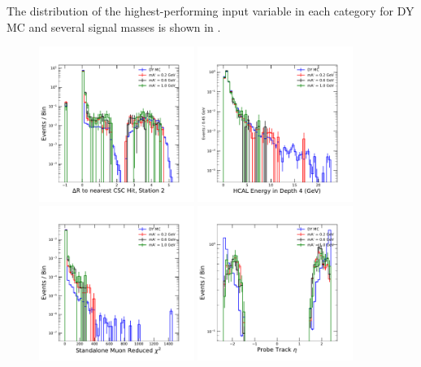 The distribution of the highest-performing input variable in each category for DY MC and several signal masses is shown in .

\begin{figure}[htpb]
	\centering
	\includegraphics[width=0.45\textwidth]{figures/bdtInputFeatscscDRbyStation_1.pdf}
	\hspace{0.01\textwidth}
	\includegraphics[width=0.45\textwidth]{figures/bdtInputFeatsHEDepth_4.pdf}
	\includegraphics[width=0.45\textwidth]{figures/bdtInputFeatsstaChi.pdf}
	\hspace{0.01\textwidth}
	\includegraphics[width=0.45\textwidth]{figures/bdtInputFeatseta.pdf}

\end{figure}
